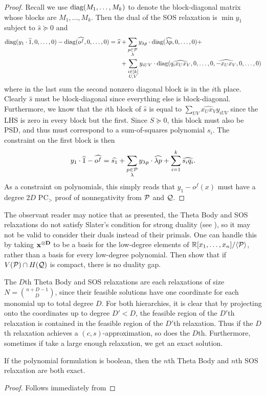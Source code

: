 \begin{proof}
Recall we use $\text{diag}(M_1,\dots,M_k)$ to denote the block-diagonal matrix whose blocks are $M_1,\dots,M_k$. Then the dual of the SOS relaxation is $\min y_1$ subject to $\hat{s} \succeq 0$ and
\begin{align*}
\text{diag}(y_1 \cdot \widehat{1},0,\dots,0) - \text{diag}(\widehat{o^f},0,\dots,0) = \widehat{s} &+ \sum_{\substack{p \in \mathcal P \\ \lambda}}  y_{\lambda p}\cdot \text{diag}(\widehat{\lambda p},0,\dots,0) +\\
&+ \sum_{\substack{i \in [k] \\ U,V}} y_{iUV}\cdot \text{diag}(\widehat{q_ix_Ux_V},0,\dots,0,\widehat{-x_Ux_V},0,\dots,0)
\end{align*}
where in the last sum the second nonzero diagonal block is in the $i$th place. Clearly $\widehat{s}$ must be block-diagonal since everything else is block-diagonal. Furthermore, we know that the $i$th block of $\widehat{s}$ is equal to $\sum_{UV} \widehat{x_Ux_V}y_{iUV}$ since the LHS is zero in every block but the first. Since $S \succeq 0$, this block must also be PSD, and thus must correspond to a sum-of-squares polynomial $s_i$. The constraint on the first block is then
\[y_1 \cdot \widehat{1} - \widehat{o^f} = \widehat{s_1} + \sum_{\substack{p \in \mathcal P \\ \lambda}} y_{\lambda p}\cdot \widehat{\lambda p}  + \sum_{i=1}^k \widehat{s_i q_i}.\]
As a constraint on polynomials, this simply reads that $y_1 - o^f(x)$ must have a degree $2D$ PC$_>$ proof of nonnegativity from $\mathcal P$ and $\mathcal Q$.
\end{proof}

\begin{remark}
The observant reader may notice that as presented, the Theta Body and SOS relaxations do not satisfy Slater's condition for strong duality (see ), so it may not be valid to consider their duals instead of their primals. One can handle this by taking $\mathbf{x^{\otimes D}}$ to be a basis for the low-degree elements of $\mathbb R[x_1,\dots,x_n]/\langle \mathcal P \rangle$, rather than a basis for every low-degree polynomial. Then \cite{JH16} show that if $V(\mathcal P) \cap H(\mathcal Q)$ is compact, there is no duality gap.
\end{remark}

The $D$th Theta Body and SOS relaxations are each relaxations of size $N = \binom{n+D-1}{D}$, since their feasible solutions have one coordinate for each monomial up to total degree $D$. For both hierarchies, it is clear that by projecting onto the coordinates up to degree $D' < D$, the feasible region of the $D'$th relaxation is contained in the feasible region of the $D'$th relaxation. Thus if the $D$th relaxation achieves a $(c,s)$-approximation, so does the $D$th. Furthermore, sometimes if take a large enough relaxation, we get an exact solution.
\begin{lemma}
If the polynomial formulation is boolean, then the $n$th Theta Body and $n$th SOS relaxation are both exact.
\end{lemma}
\begin{proof}
Follows immediately from 
\end{proof}

